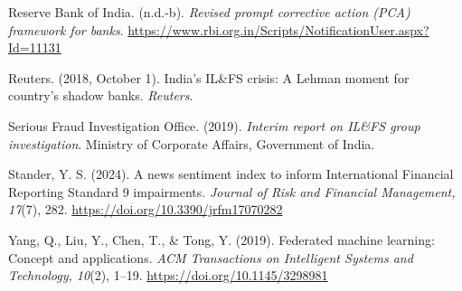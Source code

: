 \documentclass[12pt]{article}
\newcommand{\aparef}[1]{\par\noindent\hangindent=0.5in\hangafter=1 #1\par}
\begin{document}
\aparef{Reserve Bank of India. (n.d.-b). \textit{Revised prompt corrective action (PCA) framework for banks}. \url{https://www.rbi.org.in/Scripts/NotificationUser.aspx?Id=11131}}

\aparef{Reuters. (2018, October 1). India's IL\&FS crisis: A Lehman moment for country's shadow banks. \textit{Reuters}.}

\aparef{Serious Fraud Investigation Office. (2019). \textit{Interim report on IL\&FS group investigation}. Ministry of Corporate Affairs, Government of India.}

\aparef{Stander, Y. S. (2024). A news sentiment index to inform International Financial Reporting Standard 9 impairments. \textit{Journal of Risk and Financial Management, 17}(7), 282. \url{https://doi.org/10.3390/jrfm17070282}}

\aparef{Yang, Q., Liu, Y., Chen, T., \& Tong, Y. (2019). Federated machine learning: Concept and applications. \textit{ACM Transactions on Intelligent Systems and Technology, 10}(2), 1--19. \url{https://doi.org/10.1145/3298981}}
\end{document}
